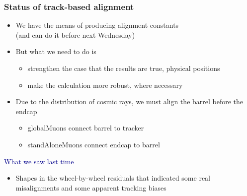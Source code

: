 \documentclass[compress]{beamer}
\begin{document}


\begin{frame}
\frametitle{Status of track-based alignment}

\begin{itemize}\setlength{\itemsep}{0.4 cm}
\item We have the means of producing alignment constants \\ (and can do
  it before next Wednesday)
\item But what we need to do is
\begin{itemize}
\item strengthen the case that the results are true, physical positions
\item make the calculation more robust, where necessary
\end{itemize}
\item Due to the distribution of cosmic rays, we must align the barrel
  before the endcap
\begin{itemize}
\item globalMuons connect barrel to tracker
\item standAloneMuons connect endcap to barrel
\end{itemize}
\end{itemize}

\vfill
\hspace{-0.83 cm} \textcolor{darkblue}{\Large What we saw last time}

\vspace{0.1 cm}
\begin{itemize}
\item Shapes in the wheel-by-wheel residuals that indicated some real
  misalignments and some apparent tracking biases
\end{itemize}
\end{frame}

\end{document}
